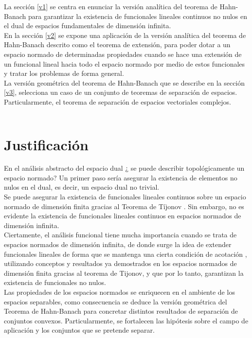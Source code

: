 \documentclass[10pt]{amsart}
\theoremstyle{remark}
\numberwithin{equation}{section}
\begin{document}
La sección \ref{v1} se centra en enunciar la versión analítica del teorema de Hahn-Banach para garantizar la existencia de funcionales lineales continuos no nulos en el dual de espacios fundamentales de dimensión infinita.\\

En la sección \ref{v2} se expone una aplicación de la versión analítica del teorema de Hahn-Banach descrito como el teorema de extensión, para poder dotar a un espacio normado de determinadas propiedades cuando se hace una extensión de un funcional lineal hacia todo el espacio normado por medio de estos funcionales y tratar los problemas de forma general.\\

La versión geométrica del teorema de Hahn-Banach que se describe en la sección \ref{v3}, selecciona un caso de un conjunto de teoremas de separación de espacios. Particularmente, el teorema de separación de espacios vectoriales complejos.\\ \\



\section{Justificación}
En el análisis abstracto del espacio dual ¿ se puede describir topológicamente un espacio normado? Un primer paso sería asegurar la existencia de elementos no nulos en el dual, es decir, un espacio dual no trivial.\\

Se puede asegurar la existencia de funcionales lineales continuos sobre un espacio normado de dimensión finita gracias al Teorema de Tíjonov \cite{ArtAca12}. Sin embargo, no es evidente la existencia de funcionales lineales continuos en espacios normados de dimensión infinita.\\ 

Ciertamente, el análisis funcional tiene mucha importancia cuando se trata de espacios normados de dimensión infinita, de donde surge la idea de extender funcionales lineales de forma que se mantenga una cierta condición de acotación \cite{Rev15}, utilizando conceptos y resultados ya demostrados en los espacios normados de dimensión finita gracias al teorema de Tijonov, y que por lo tanto, garantizan la existencia de funcionales no nulos.\\   

Las propiedades de los espacios normados se enriquecen en el ambiente de los espacios separables, como consecuencia se deduce la versión geométrica del Teorema de Hahn-Banach para concretar distintos resultados de separación de conjuntos convexos. Particularmente, se fortalecen las hipótesis sobre el campo de aplicación y los conjuntos que se pretende separar.\\
\end{document}
